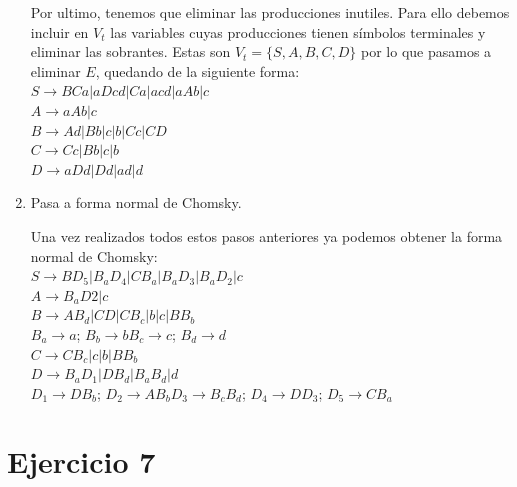 \documentclass[10pt,a4paper,spanish]{report}
\begin{document}
\begin{enumerate}
	      \noindent
	      Por ultimo, tenemos que eliminar las producciones inutiles. Para ello debemos incluir en $V_t$ las variables cuyas producciones tienen símbolos terminales y eliminar las sobrantes. Estas son $V_t = \{S, A, B, C, D\}$ por lo que pasamos a eliminar $E$, quedando de la siguiente forma: \\

	      $S \rightarrow BCa | aDcd | Ca | acd | aAb | c$ \\
	      $A \rightarrow aAb | c$ \\
	      $B \rightarrow Ad | Bb | c | b | Cc | CD$ \\
	      $C \rightarrow Cc | Bb | c | b$ \\
	      $D \rightarrow aDd | Dd | ad | d$ \\

	\item Pasa a forma normal de Chomsky.

	      \noindent
	      Una vez realizados todos estos pasos anteriores ya podemos obtener la forma normal de Chomsky: \\

	      $S \rightarrow BD_5 | B_aD_4 | CB_a | B_aD_3 | B_aD_2 | c$ \\
	      $A \rightarrow B_aD2 | c$ \\
	      $B \rightarrow AB_d | CD | CB_c | b | c | BB_b$ \\
	      $B_a \rightarrow a$; $B_b \rightarrow b$$B_c \rightarrow c$; $B_d \rightarrow d$ \\
	      $C \rightarrow CB_c | c | b | BB_b$ \\
	      $D \rightarrow B_aD_1 | DB_d | B_aB_d | d$ \\
	      $D_1 \rightarrow DB_b$; $D_2 \rightarrow AB_b$$D_3 \rightarrow B_cB_d$; $D_4 \rightarrow DD_3$; $D_5 \rightarrow CB_a$


\end{enumerate}


\chapter{Ejercicio 7}
\end{document}
